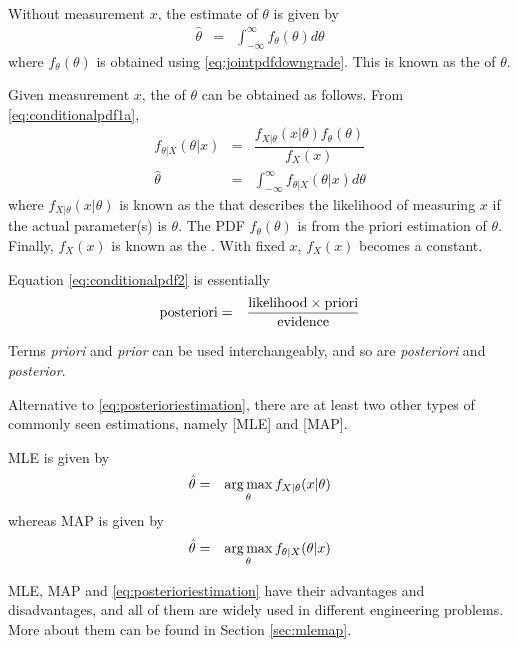 Without measurement $x$, the estimate of $\theta$ is given by
\begin{eqnarray}
	\hat{\theta} &=& \int_{-\infty}^{\infty} f_\theta(\theta) d\theta \nonumber
\end{eqnarray}
where $f_\theta(\theta)$ is obtained using \eqref{eq:jointpdfdowngrade}. This is known as the  of $\theta$. 

Given measurement $x$, the  of $\theta$ can be obtained as follows. From \eqref{eq:conditionalpdf1a},
\begin{eqnarray}
  f_{\theta|X}(\theta|x) &=& \dfrac{f_{X|\theta}(x|\theta)f_\theta(\theta)}{f_X(x)} \label{eq:conditionalpdf2} \\
  \hat{\theta} &=& \int_{-\infty}^{\infty} f_{\theta|X}(\theta|x) d\theta \label{eq:posterioriestimation}
\end{eqnarray}
where $f_{X|\theta}(x|\theta)$ is known as the  that describes the likelihood of measuring $x$ if the actual parameter(s) is $\theta$. The PDF $f_\theta(\theta)$ is from the priori estimation of $\theta$. Finally, $f_X(x)$ is known as the . With fixed $x$, $f_X(x)$ becomes a constant.

Equation \eqref{eq:conditionalpdf2} is essentially
\begin{eqnarray}
  \textup{posteriori} &=& \dfrac{\textup{likelihood}\times\textup{priori}}{\textup{evidence}} \label{eq:posteriorimemo}
\end{eqnarray} 

Terms \textit{priori} and \textit{prior} can be used interchangeably, and so are \textit{posteriori} and \textit{posterior}.

\begin{shortbox}

Alternative to \eqref{eq:posterioriestimation}, there are at least two other types of commonly seen estimations, namely [MLE] and [MAP].

MLE is given by
\begin{eqnarray}
  \hat{\theta} &=& \operatorname*{arg\,max}_\theta f_{X|\theta}(x|\theta) \nonumber
\end{eqnarray}
whereas MAP is given by
\begin{eqnarray}
  \hat{\theta} &=& \operatorname*{arg\,max}_\theta f_{\theta|X}(\theta|x) \nonumber
\end{eqnarray}

MLE, MAP and \eqref{eq:posterioriestimation} have their advantages and disadvantages, and all of them are widely used in different engineering problems. More about them can be found in Section \ref{sec:mlemap}.

\end{shortbox}

